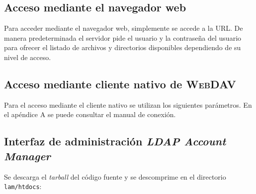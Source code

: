       \subsection {Acceso mediante el navegador web}

Para acceder mediante el navegador web, simplemente se accede a la URL. De manera predeterminada el servidor pide el usuario y la contrase\~{n}a del usuario para ofrecer el listado de  archivos y directorios disponibles dependiendo de su nivel de acceso.

      \subsection {Acceso mediante cliente nativo de \textsc{WebDAV}}

Para el acceso mediante el cliente nativo se utilizan los siguientes par\'{a}metros. En el ap\'{e}ndice A se puede consultar el manual de conexi\'{o}n.

{
 \begin{table}[H]
 \caption{Par\'{a}metros de conexi\'{o}n \texttt{WebDAV}}{}
 \label{tab:webdav-parameters}
 \noindent{} %
 \end{table}
}

%

      \subsection {Interfaz de administraci\'{o}n \textit{LDAP Account Manager}}

Se descarga el \textit{tarball} del c\'{o}digo fuente y se descomprime en el directorio \texttt{lam/htdocs}:

